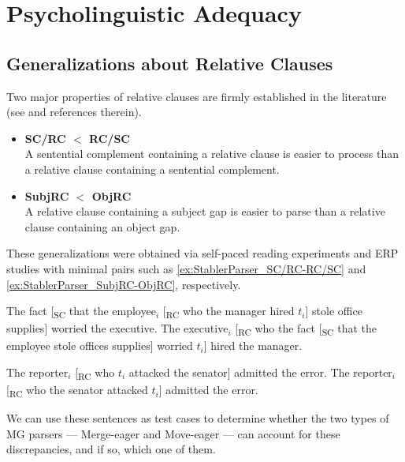 \section{Psycholinguistic Adequacy}
\subsection{Generalizations about Relative Clauses}
Two major properties of relative clauses are firmly established in the literature (see \citealt{Gibson98} and references therein).
%
\begin{itemize}
    \item \textbf{SC\slash RC $<$ RC\slash SC}\\
        A sentential complement containing a relative clause is easier to process than a relative clause containing a sentential complement.
    \item \textbf{SubjRC $<$ ObjRC}\\
        A relative clause containing a subject gap is easier to parse than a relative clause containing an object gap.
\end{itemize}
%
These generalizations were obtained via self-paced reading experiments and ERP studies with minimal pairs such as \eqref{ex:StablerParser_SC/RC-RC/SC} and \eqref{ex:StablerParser_SubjRC-ObjRC}, respectively.
%
\begin{exe}
    \ex\label{ex:StablerParser_SC/RC-RC/SC}
    \begin{xlist}
        \ex The fact [\textsubscript{SC} that the employee$_i$ [\textsubscript{RC} who the manager hired $t_i$] stole office supplies] worried the executive.
        \label{ex:StablerParser_SC/RC}
        \ex The executive$_i$ [\textsubscript{RC} who the fact [\textsubscript{SC} that the employee stole offices supplies] worried $t_i$] hired the manager.
        \label{ex:StablerParser_RC/SC}
    \end{xlist}
    \ex\label{ex:StablerParser_SubjRC-ObjRC}
    \begin{xlist}
        \ex The reporter$_i$ [\textsubscript{RC} who $t_i$ attacked the senator] admitted the error.
        \label{ex:StablerParser_SubjRC}
        \ex The reporter$_i$ [\textsubscript{RC} who the senator attacked $t_i$] admitted the error.
        \label{ex:StablerParser_ObjRC}
    \end{xlist}
\end{exe}
%
We can use these sentences as test cases to determine whether the two types of MG parsers --- Merge-eager and Move-eager --- can account for these discrepancies, and if so, which one of them.

